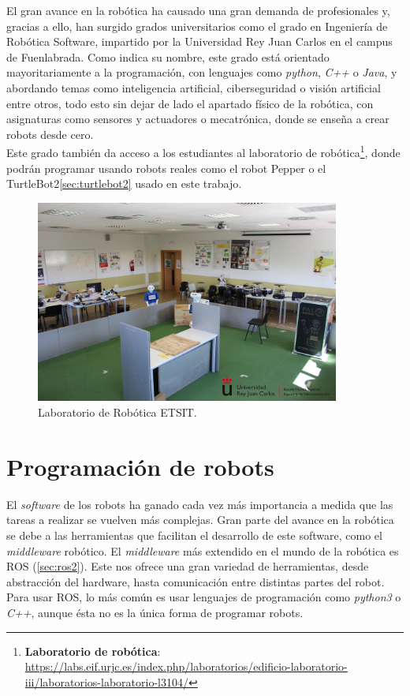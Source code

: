 El gran avance en la robótica ha causado una gran demanda de profesionales y, gracias a ello, han surgido grados universitarios como el grado en
Ingeniería de Robótica Software, impartido por la Universidad Rey Juan Carlos en el campus de Fuenlabrada.
Como indica su nombre, este grado está orientado mayoritariamente a la programación, con lenguajes como \textit{python}, \textit{C++} o
\textit{Java}, y abordando temas como inteligencia artificial, ciberseguridad o visión artificial entre otros, todo esto sin dejar de lado
el apartado físico de la robótica, con asignaturas como sensores y actuadores o mecatrónica, donde se enseña a crear robots desde cero.\\

Este grado también da acceso a los estudiantes al laboratorio de
robótica\footnote{\textbf{Laboratorio de robótica}: \url{https://labs.eif.urjc.es/index.php/laboratorios/edificio-laboratorio-iii/laboratorios-laboratorio-l3104/}},
donde podrán programar usando robots reales como el robot Pepper o el TurtleBot2\ref{sec:turtlebot2} usado en este trabajo.

\begin{figure} [H]
  \begin{center}
    \includegraphics[width=10cm]{figs/c1/rob_lab.jpg}
  \end{center}
  \caption[Laboratorio Robótica]{Laboratorio de Robótica ETSIT.}
  \label{fig:rob_lab}
\end{figure}

\section{Programación de robots}
\label{sec:prog_rob}

El \textit{software} de los robots ha ganado cada vez más importancia a medida que las tareas a realizar se vuelven más complejas.
Gran parte del avance en la robótica se debe a las herramientas que facilitan el desarrollo de este software, como el \textit{middleware} robótico.
El \textit{middleware} más extendido en el mundo de la robótica es ROS (\ref{sec:ros2}). Este nos ofrece una gran variedad de herramientas, desde 
abstracción del hardware, hasta comunicación entre distintas partes del robot. Para usar ROS, lo más común es usar lenguajes de programación como
\textit{python3} o \textit{C++}, aunque ésta no es la única forma de programar robots.

